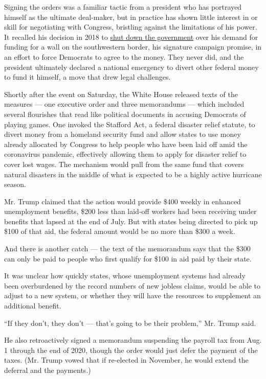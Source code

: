 Signing the orders was a familiar tactic from a president who has
portrayed himself as the ultimate deal-maker, but in practice has shown
little interest in or skill for negotiating with Congress, bristling
against the limitations of his power. It recalled his decision in 2018
to
\href{https://www.nytimes3xbfgragh.onion/2018/12/21/us/politics/trump-shutdown-border-wall.html}{shut
down the government} over his demand for funding for a wall on the
southwestern border, his signature campaign promise, in an effort to
force Democrats to agree to the money. They never did, and the president
ultimately declared a national emergency to divert other federal money
to fund it himself, a move that drew legal challenges.

Shortly after the event on Saturday, the White House released texts of
the measures --- one executive order and three memorandums --- which
included several flourishes that read like political documents in
accusing Democrats of playing games. One invoked the Stafford Act, a
federal disaster relief statute, to divert money from a homeland
security fund and allow states to use money already allocated by
Congress to help people who have been laid off amid the coronavirus
pandemic, effectively allowing them to apply for disaster relief to
cover lost wages. The mechanism would pull from the same fund that
covers natural disasters in the middle of what is expected to be a
highly active hurricane season.

Mr. Trump claimed that the action would provide \$400 weekly in enhanced
unemployment benefits, \$200 less than laid-off workers had been
receiving under benefits that lapsed at the end of July. But with states
being directed to pick up \$100 of that aid, the federal amount would be
no more than \$300 a week.

And there is another catch --- the text of the memorandum says that the
\$300 can only be paid to people who first qualify for \$100 in aid paid
by their state.

It was unclear how quickly states, whose unemployment systems had
already been overburdened by the record numbers of new jobless claims,
would be able to adjust to a new system, or whether they will have the
resources to supplement an additional benefit.

``If they don't, they don't --- that's going to be their problem,'' Mr.
Trump said.

He also retroactively signed a memorandum suspending the payroll tax
from Aug. 1 through the end of 2020, though the order would just defer
the payment of the taxes. (Mr. Trump vowed that if re-elected in
November, he would extend the deferral and the payments.)

